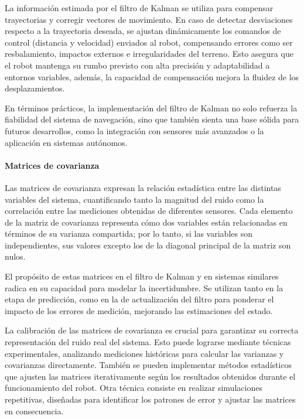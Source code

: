 La información estimada por el filtro de Kalman se utiliza para compensar trayectorias y corregir vectores de movimiento. En caso de detectar desviaciones respecto a la trayectoria deseada, se ajustan dinámicamente los comandos de control (distancia y velocidad) enviados al robot, compensando errores como ser resbalamiento, impactos externos e irregularidades del terreno. Esto asegura que el robot mantenga su rumbo previsto con alta precisión y adaptabilidad a entornos variables, además, la capacidad de compensación mejora la fluidez de los desplazamientos.

En términos prácticos, la implementación del filtro de Kalman no solo refuerza la fiabilidad del sistema de navegación, sino que también sienta una base sólida para futuros desarrollos, como la integración con sensores más avanzados o la aplicación en sistemas autónomos.


\paragraph{Matrices de covarianza} \mbox{} \vspace{8pt}

Las matrices de covarianza expresan la relación estadística entre las distintas variables del sistema, cuantificando tanto la magnitud del ruido como la correlación entre las mediciones obtenidas de diferentes sensores. Cada elemento de la matriz de covarianza representa cómo dos variables están relacionadas en términos de su varianza compartida; por lo tanto, si las variables son independientes, sus valores excepto los de la diagonal principal de la matriz son nulos.

El propósito de estas matrices en el filtro de Kalman y en sistemas similares radica en su capacidad para modelar la incertidumbre. Se utilizan tanto en la etapa de predicción, como en la de actualización del filtro para ponderar el impacto de los errores de medición, mejorando las estimaciones del estado. \cite{tzafestas2013introduction} \cite{Rigatos01062007}

La calibración de las matrices de covarianza es crucial para garantizar su correcta representación del ruido real del sistema. Esto puede lograrse mediante técnicas experimentales, analizando mediciones históricas para calcular las varianzas y covarianzas directamente. También se pueden implementar métodos estadísticos que ajusten las matrices iterativamente según los resultados obtenidos durante el funcionamiento del robot. Otra técnica consiste en realizar simulaciones repetitivas, diseñadas para identificar los patrones de error y ajustar las matrices en consecuencia. \cite{Bang18}

